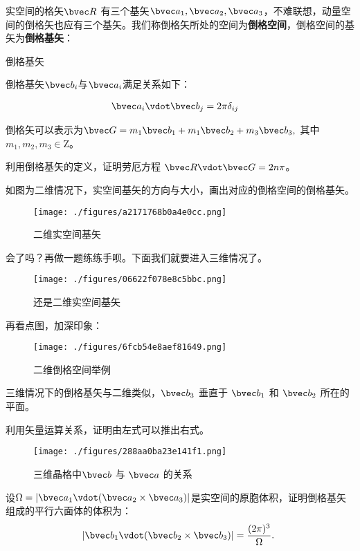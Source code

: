 实空间的格矢$\bvec R$ 有三个基矢$\bvec a_1, \bvec a_2, \bvec a_3$，不难联想，动量空间的倒格矢也应有三个基矢。我们称倒格矢所处的空间为\textbf{倒格空间}，倒格空间的基矢为\textbf{倒格基矢}：
\begin{definition}{倒格基矢}

倒格基矢$\bvec b_i$与$\bvec a_i$满足关系如下：

\begin{align}
\bvec a_i \vdot \bvec b_j  &= 2\pi \delta_{ij}
\end{align}


\end{definition}
倒格矢可以表示为$\bvec G = m_1 \bvec b_1 +  m_1 \bvec b_2 + m_3 \bvec b_3,~$其中$ m_1,m_2,m_3 \in \mathrm{Z}$。
\begin{exercise}{}
利用倒格基矢的定义，证明劳厄方程 $\bvec R \vdot \bvec G = 2 n \pi$。
\end{exercise}
\begin{exercise}{}
如图为二维情况下，实空间基矢的方向与大小，画出对应的倒格空间的倒格基矢。
\begin{figure}[ht]
\centering
\texttt{[image: ./figures/a2171768b0a4e0cc.png]}
\caption{二维实空间基矢} \label{fig_RecLat_5}
\end{figure}

\end{exercise}

\begin{exercise}{}
会了吗？再做一题练练手呗。下面我们就要进入三维情况了。
\begin{figure}[ht]
\centering
\texttt{[image: ./figures/06622f078e8c5bbc.png]}
\caption{还是二维实空间基矢} \label{fig_RecLat_6}
\end{figure}
\end{exercise}

再看点图，加深印象：

\begin{figure}[ht]
\centering
\texttt{[image: ./figures/6fcb54e8aef81649.png]}
\caption{二维倒格空间举例} \label{fig_RecLat_8}
\end{figure}

三维情况下的倒格基矢与二维类似，$\bvec b_3$ 垂直于 $\bvec b_1 $ 和 $\bvec b_2 $ 所在的平面。
\begin{exercise}{}
利用矢量运算关系，证明由左式可以推出右式。
\begin{figure}[ht]
\centering
\texttt{[image: ./figures/288aa0ba23e141f1.png]}
\caption{三维晶格中$\bvec b$ 与 $\bvec a$ 的关系} \label{fig_RecLat_7}
\end{figure}

\end{exercise}

\begin{exercise}{}
设$\Omega = |\bvec a_1 \vdot (\bvec a_2 \times \bvec a_3)|$是实空间的原胞体积，证明倒格基矢组成的平行六面体的体积为：
\begin{equation}
|\bvec b_1 \vdot (\bvec b_2 \times \bvec b_3)| = \dfrac{(2\pi)^3}{\Omega}.~
\end{equation}

\end{exercise}